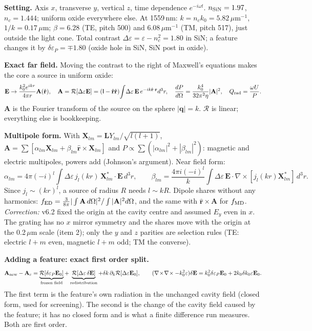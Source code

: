 \documentclass[11pt,a4paper]{article}
\begin{document}
\textbf{Setting.} Axis $x$, transverse $y$, vertical $z$, time dependence $e^{-i\omega t}$. $n_{\rm SiN}=1.97$,
$n_c=1.444$; uniform oxide everywhere else. At 1559\,nm: $k=n_ck_0=5.82$\,$\mu$m$^{-1}$, $1/k=0.17$\,$\mu$m;
$\beta=6.28$ (TE, pitch 500) and 6.08\,$\mu$m$^{-1}$ (TM, pitch 517), just outside the light cone. Total contrast
$\Delta\varepsilon=\varepsilon-n_c^2=1.80$ in SiN; a feature changes it by $\delta\varepsilon_P=\mp1.80$ (oxide
hole in SiN, SiN post in oxide).

\textbf{Exact far field.} Moving the contrast to the right of Maxwell's equations makes the core a source in
uniform oxide:
\[
\mathbf E\to\frac{k_0^2e^{ikr}}{4\pi r}\mathbf A(\hat{\mathbf r}),\quad
\mathbf A=\mathcal R[\Delta\varepsilon\mathbf E]=(\mathsf I-\hat{\mathbf r}\hat{\mathbf r})\!\int\!\Delta\varepsilon\,\mathbf E\,
e^{-ik\hat{\mathbf r}\cdot\mathbf r}d^3r,\quad
\frac{dP}{d\Omega}=\frac{k_0^4}{32\pi^2\eta}|\mathbf A|^2,\quad Q_{\rm rad}=\frac{\omega U}{P}.
\]
$\mathbf A$ is the Fourier transform of the source on the sphere $|\mathbf q|=k$. $\mathcal R$ is linear;
everything else is bookkeeping.

\textbf{Multipole form.} With $\mathbf X_{lm}=\mathbf LY_{lm}/\sqrt{l(l+1)}$,
$\mathbf A=\sum[\alpha_{lm}\mathbf X_{lm}+\beta_{lm}\hat{\mathbf r}\times\mathbf X_{lm}]$ and
$P\propto\sum(|\alpha_{lm}|^2+|\beta_{lm}|^2)$: magnetic and electric multipoles, powers add (Johnson's
argument). Near field form:
\[
\alpha_{lm}=4\pi(-i)^l\!\int\!\Delta\varepsilon\,j_l(kr)\,\mathbf X^*_{lm}\!\cdot\mathbf E\,d^3r,\qquad
\beta_{lm}=\frac{4\pi i(-i)^l}{k}\!\int\!\Delta\varepsilon\,\mathbf E\cdot\nabla\times[j_l(kr)\mathbf X^*_{lm}]\,d^3r .
\]
Since $j_l\sim(kr)^l$, a source of radius $R$ needs $l\sim kR$. Dipole shares without any harmonics:
$f_{\rm ED}=\frac{3}{8\pi}|\int\mathbf A\,d\Omega|^2/\int|\mathbf A|^2d\Omega$, and the same with
$\hat{\mathbf r}\times\mathbf A$ for $f_{\rm MD}$.
\emph{Correction:} v6.2 fixed the origin at the cavity centre and assumed $E_y$ even in $x$. The grating has no
$x$ mirror symmetry and the shares move with the origin at the 0.2\,$\mu$m scale (item 2); only the $y$ and $z$
parities are selection rules (TE: electric $l+m$ even, magnetic $l+m$ odd; TM the converse).

\textbf{Adding a feature: exact first order split.}
\[
\mathbf A_{\rm new}-\mathbf A_c=\underbrace{\mathcal R[\delta\varepsilon_P\mathbf E_0]}_{\text{frozen field}}
+\underbrace{\mathcal R[\Delta\varepsilon\,\delta\mathbf E]}_{\text{redistribution}}
+\delta k\,\partial_k\mathcal R[\Delta\varepsilon\mathbf E_0],\qquad
(\nabla\!\times\!\nabla\!\times-k_0^2\varepsilon)\delta\mathbf E=k_0^2\delta\varepsilon_P\mathbf E_0+2k_0\delta k_0\varepsilon\mathbf E_0 .
\]
The first term is the feature's own radiation in the unchanged cavity field (closed form, used for screening).
The second is the change of the cavity field caused by the feature; it has no closed form and is what a finite
difference run measures. Both are first order.
\end{document}
